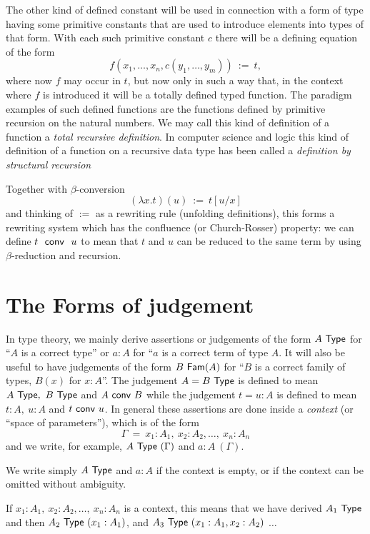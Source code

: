 {The other kind of defined constant will be used in connection with a form of type having some primitive constants that are used to introduce elements into types of that form.  With each such primitive constant $c$ there will be a defining equation of the form
$$
f(x_1,\dots,x_n,c(y_1,\dots,y_m)) ~:=~ t,
$$
where now $f$ may occur in $t$, but now only in such a way that, in the context where $f$ is introduced it will be a totally defined typed function.
The paradigm examples of such defined functions are the functions defined by primitive recursion on the natural numbers.  We may call this kind of definition of a function a {\em total recursive definition}.  In computer science and logic this kind of definition of a function on a recursive data type has been called a {\em definition by structural recursion}

Together with $\beta$-conversion
$$
(\lambda x.t)(u) ~:=~ t[u/x]
$$
and thinking of $:=$ as a rewriting rule (unfolding definitions),
this forms a rewriting system which has the confluence (or Church-Rosser) property: we can
define $t~~{\sf conv}~~u$ to mean that $t$ and $u$ can be reduced to the same term by using
$\beta$-reduction and recursion.

\section*{The Forms of judgement}

 In type theory, we mainly derive assertions or judgements of the form $A~{\sf Type}$ for ``$A$ is a correct type'' or $a:A$ for ``$a$ is a correct term of type $A$.  It will also be useful to have judgements of the form $B~{\sf Fam}(A)$
for ``$B$ is a correct family of types, $B(x)$ for $x:A$''.
The judgement $A=B~{\sf Type}$ is defined to mean $A~{\sf Type},~B~{\sf Type}$ and $A~{\sf conv}~ B$
while the judgement $t=u:A$ is defined to mean $t:A,~u:A$ and $t~{\sf conv}~ u$.
In general
these assertions are done inside a {\em context} (or ``space of parameters''), which is of
the form
$$
\Gamma ~=~  x_1:A_1,~x_2:A_2,\dots,~x_n:A_n
$$
and we write, for example, $A~{\sf Type}~(\Gamma)$ and $a:A~(\Gamma)$. 

 We write simply $A~{\sf Type}$ and $a:A$ if the context is empty, or if the context
can be omitted without ambiguity.

 If $x_1:A_1,~x_2:A_2,\dots,~x_n:A_n$ is a context, this means that we have
derived $A_1~{\sf Type}$ and then $A_2~{\sf Type}~(x_1:A_1)$, and $A_3~{\sf Type}~(x_1:A_1,x_2:A_2)$
$\dots$

\medskip

}
